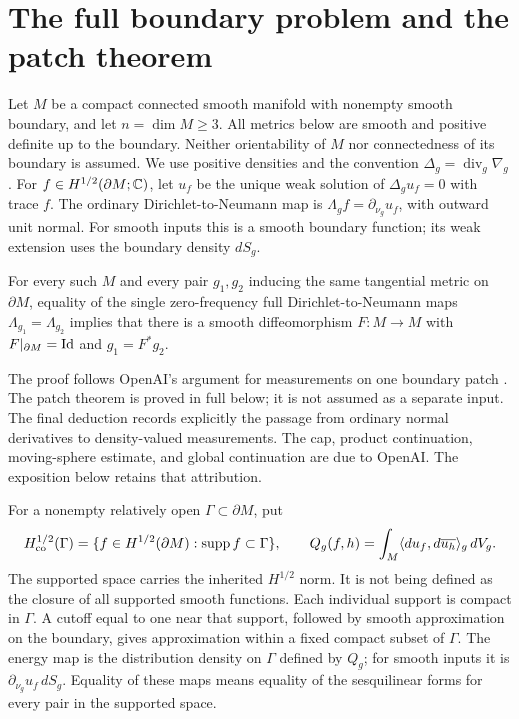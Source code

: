\section{The full boundary problem and the patch theorem}
\label{sec:target}
Let $M$ be a compact connected smooth manifold with nonempty smooth boundary,
and let $n=\dim M\ge3$. All metrics below are smooth and positive definite
up to the boundary. Neither orientability of $M$ nor connectedness of its
boundary is assumed. We use positive densities and the convention
$\Delta_g=\operatorname{div}_g\nabla_g$.
For $f\in H^{1/2}(\partial M;\mathbb C)$, let $u_f$ be the unique weak solution
of $\Delta_gu_f=0$ with trace $f$. The ordinary Dirichlet-to-Neumann
map is $\Lambda_g f=\partial_{\nu_g}u_f$, with outward unit normal.
For smooth inputs this is a smooth boundary function; its weak extension
uses the boundary density $dS_g$.

\begin{theorem}\label{main:full}
For every such $M$ and every pair $g_1,g_2$ inducing the same tangential
metric on $\partial M$, equality of the single zero-frequency full
Dirichlet-to-Neumann maps $\Lambda_{g_1}=\Lambda_{g_2}$ implies that
there is a smooth diffeomorphism $F:M\to M$ with
$F|_{\partial M}=\mathrm{Id}$ and $g_1=F^*g_2$.
\end{theorem}

The proof follows OpenAI's argument for measurements on one boundary
patch \citep[Theorem~1.1 and Corollary~1.2]{OpenAI2026}.
The patch theorem is proved in full below; it is not assumed as a separate
input. The final deduction records explicitly the passage from ordinary
normal derivatives to density-valued measurements. The cap, product
continuation, moving-sphere estimate, and global continuation are due to
OpenAI. The exposition below retains that attribution.

For a nonempty relatively open $\Gamma\subset\partial M$, put
\[
 H^{1/2}_{\mathrm{co}}(\Gamma)
 =\{f\in H^{1/2}(\partial M):\operatorname{supp} f\subset\Gamma\},
 \qquad
 Q_g(f,h)=\int_M\langle du_f,d\overline{u_h}\rangle_g\,dV_g.
\]
The supported space carries the inherited $H^{1/2}$ norm. It is not
being defined as the closure of all supported smooth functions. Each
individual support is compact in $\Gamma$. A cutoff equal to one near
that support, followed by smooth approximation on the boundary, gives
approximation within a fixed compact subset of $\Gamma$.
The energy map is the distribution density on $\Gamma$ defined by
$Q_g$; for smooth inputs it is
$\partial_{\nu_g}u_f\,dS_g$. Equality of these maps means equality
of the sesquilinear forms for every pair in the supported space.

